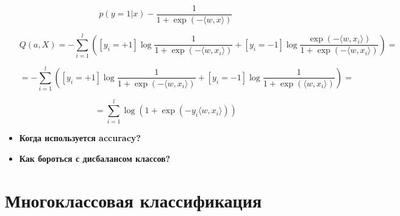 \documentclass[12pt]{article}
\begin{document}
\begin{itemize}
\[ p(y=1|x) - \frac{1}{1+\exp(-\langle w, x \rangle)} \]

\[ Q(a, X) = - \sum_{i=1}^l \left( [y_i = +1] \log \frac{1}{1+\exp(-\langle w, x_i \rangle)} + [y_i = -1] \log \frac{\exp(-\langle w, x_i \rangle)}{1 + \exp(-\langle w, x_i \rangle)} \right) = \]

\[
= - \sum_{i=1}^l \left( [y_i = +1] \log \frac{1}{1+\exp(-\langle w, x_i \rangle)} + [y_i = -1] \log \frac{1}{1 + \exp(\langle w, x_i \rangle)} \right) = 
\]

\[ = \sum_{i=1}^l \log \left( 1+\exp(-y_i \langle w, x_i \rangle) \right) \]

\item \textbf{Когда используется accuracy?}

\item \textbf{Как бороться с дисбалансом классов?}


\end{itemize}

\section*{Многоклассовая классификация}
\end{document}
